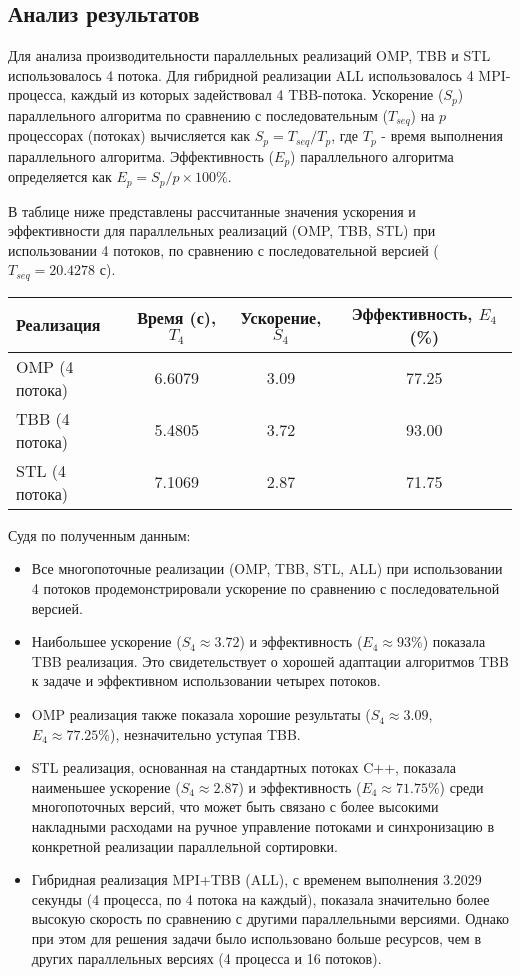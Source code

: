 \documentclass[12pt]{article}
\begin{document}
\subsection{Анализ результатов}
Для анализа производительности параллельных реализаций OMP, TBB и STL использовалось 4 потока. Для гибридной реализации ALL использовалось 4 MPI-процесса, каждый из которых задействовал 4 TBB-потока.
Ускорение ($S_p$) параллельного алгоритма по сравнению с последовательным ($T_{seq}$) на $p$ процессорах (потоках) вычисляется как $S_p = T_{seq} / T_p$, где $T_p$ - время выполнения параллельного алгоритма.
Эффективность ($E_p$) параллельного алгоритма определяется как $E_p = S_p / p \times 100\%$.

В таблице ниже представлены рассчитанные значения ускорения и эффективности для параллельных реализаций (OMP, TBB, STL) при использовании 4 потоков, по сравнению с последовательной версией ($T_{seq} = 20.4278$ с).

\begin{center}
\begin{tabular}{|l|c|c|c|}
\hline
\textbf{Реализация} & \textbf{Время (с), $T_4$} & \textbf{Ускорение, $S_4$} & \textbf{Эффективность, $E_4$ (\%)} \\
\hline
OMP (4 потока)    & 6.6079 & 3.09                 & 77.25 \\
\hline
TBB (4 потока)    & 5.4805 & 3.72                 & 93.00 \\
\hline
STL (4 потока)    & 7.1069 & 2.87                 & 71.75 \\
\hline
\end{tabular}
\end{center}

Судя по полученным данным:
\begin{itemize}
    \item Все многопоточные реализации (OMP, TBB, STL, ALL) при использовании 4 потоков продемонстрировали ускорение по сравнению с последовательной версией.
    \item Наибольшее ускорение ($S_4 \approx 3.72$) и эффективность ($E_4 \approx 93\%$) показала TBB реализация. Это свидетельствует о хорошей адаптации алгоритмов TBB к задаче и эффективном использовании четырех потоков.
    \item OMP реализация также показала хорошие результаты ($S_4 \approx 3.09$, $E_4 \approx 77.25\%$), незначительно уступая TBB.
    \item STL реализация, основанная на стандартных потоках C++, показала наименьшее ускорение ($S_4 \approx 2.87$) и эффективность ($E_4 \approx 71.75\%$) среди многопоточных версий, что может быть связано с более высокими накладными расходами на ручное управление потоками и синхронизацию в конкретной реализации параллельной сортировки.
    \item Гибридная реализация MPI+TBB (ALL), с временем выполнения 3.2029 секунды (4 процесса, по 4 потока на каждый), показала значительно более высокую скорость по сравнению с другими параллельными версиями. Однако при этом для решения задачи было использовано больше ресурсов, чем в других параллельных версиях (4 процесса и 16 потоков).
\end{itemize}
\end{document}
